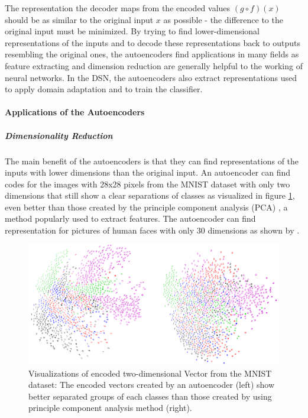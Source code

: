 The representation the decoder maps from the encoded values $(g \circ f)(x)$ should be as similar to the original input $x$ as possible - the difference to the original input must be minimized. By trying to find lower-dimensional representations of the inputs and to decode these representations back to outputs resembling the original ones, the autoencoders find applications in many fields as feature extracting and dimension reduction are generally helpful to the working of neural networks. In the DSN, the autoencoders also extract representations used to apply domain adaptation and to train the classifier. 



\paragraph*{Applications of the Autoencoders} 
\subparagraph*{Dimensionality Reduction \cite{autoencoderVisualize}} The main benefit of the autoencoders is that they can find representations of the inputs with lower dimensions than the original input. An autoencoder can find codes for the images with 28x28 pixels from the MNIST dataset with only two dimensions that still show a clear separations of classes as visualized in figure \ref{fig:mnistvisualize}, even better than those created by the principle component analysis (PCA) \cite{PCA}, a method popularly used to extract features. The autoencoder can find representation for pictures of human faces with only 30 dimensions as shown by \cite{autoencoderFace}.

\begin{figure}[tbh]
  \centering
    \includegraphics[width=\linewidth]{abbildungen/mnistvisualize.png}
  \caption{Visualizations of encoded two-dimensional Vector from the MNIST dataset: The encoded vectors created by an autoencoder (left) show better separated groups of each classes than those created by using principle component analysis method (right).}
  \label{fig:mnistvisualize} 
\end{figure}

